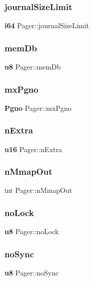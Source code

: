 \subsubsection{journalSizeLimit}
{\footnotesize\ttfamily \textbf{ i64} Pager\+::journal\+Size\+Limit}

\mbox{\label{struct_pager_abca3633b7745075aa5cf432b3fae54f2}} 
\subsubsection{memDb}
{\footnotesize\ttfamily \textbf{ u8} Pager\+::mem\+Db}

\mbox{\label{struct_pager_ad1d9a508ac764486a5eaef9b4f7781af}} 
\subsubsection{mxPgno}
{\footnotesize\ttfamily \textbf{ Pgno} Pager\+::mx\+Pgno}

\mbox{\label{struct_pager_a44e153b2f756bfb86ab471c25893b3b6}} 
\subsubsection{nExtra}
{\footnotesize\ttfamily \textbf{ u16} Pager\+::n\+Extra}

\mbox{\label{struct_pager_acacf681e33935075e2b19e0906574b95}} 
\subsubsection{nMmapOut}
{\footnotesize\ttfamily int Pager\+::n\+Mmap\+Out}

\mbox{\label{struct_pager_a829f9ffd857c0959c1822e5301caf49f}} 
\subsubsection{noLock}
{\footnotesize\ttfamily \textbf{ u8} Pager\+::no\+Lock}

\mbox{\label{struct_pager_ae943093a3ccbfbf264ccf3c8a52edac1}} 
\subsubsection{noSync}
{\footnotesize\ttfamily \textbf{ u8} Pager\+::no\+Sync}

